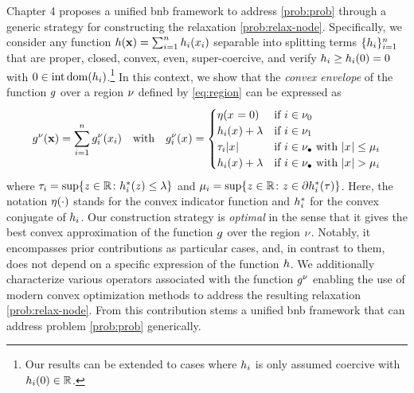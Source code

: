 \documentclass[11pt]{article}
\begin{document}
Chapter 4 proposes a unified \gls{bnb} framework to address \eqref{prob:prob} through a generic strategy for constructing the relaxation \eqref{prob:relax-node}.
Specifically, we consider any function $h(\mathbf{x}) = \sum_{i=1}^{n}h_{i}(x_{i})$ separable into splitting terms $\{h_{i}\}_{i=1}^{n}$ that are proper, closed, convex, even, super-coercive, and verify $h_{i} \geq h_{i}(0) = 0$ with $0 \in \operatorname{int}\operatorname{dom}(h_{i})$.\footnote{Our results can be extended to cases where $h_{i}$ is only assumed coercive with $\separable{\pfunc}{\idxentry}(0) \in \kR$.}
In this context, we show that the \emph{convex envelope} of the function $g$ over a region $\nu$ defined by \eqref{eq:region} can be expressed as
\begin{equation}
    g^\nu(\mathbf{x}) = \sum_{i=1}^{n}g_{i}^\nu(x_{i})
    \quad\text{with}\quad
    g_{i}^\nu(x_{}) = 
    \begin{cases}
        \eta(x_{} = 0) &\text{if } i \in \nu_0 \\
        h_{i}(x_{}) + \lambda &\text{if } i \in \nu_1 \\
        \tau_{i} |x_{}| &\text{if } i \in \nu_\bullet \text{ with }|x_{}| \leq \mu_{i} \\
        h_{i}(x_{}) + \lambda &\text{if } i \in \nu_\bullet \text{ with }|x_{}| > \mu_{i}
    \end{cases}
\end{equation}
where $\separable{\pslope}{\idxentry} = \sup\kset{\bvi{} \in \kR}{\conj{\separable{\pfunc}{\idxentry}}(\bvi{}) \leq \reg}$ and $\separable{\plimit}{\idxentry} = \sup\kset{\bvi{} \in \kR}{\bvi{} \in \subdiff\conj{\separable{\pfunc}{\idxentry}}(\pslope)}$.
Here, the notation $\eta(\cdot)$ stands for the convex indicator function and $h_{i}^{*}$ for the convex conjugate of $h_{i}$.
Our construction strategy is \emph{optimal} in the sense that it gives the best convex approximation of the function $g$ over the region $\nu$.
Notably, it encompasses prior contributions as particular cases, and, in contrast to them, does not depend on a specific expression of the function $h$.
We additionally characterize various operators associated with the function $g^\nu$ enabling the use of modern convex optimization methods to address the resulting relaxation \eqref{prob:relax-node}.
From this contribution stems a unified \gls{bnb} framework that can address problem \eqref{prob:prob} generically.
\end{document}
